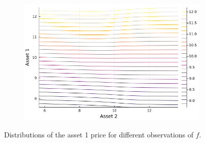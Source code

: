 \documentclass{article}
\begin{document}
\begin{figure}
\begin{subfigure}{0.4\textwidth}
    \end{subfigure}
    \begin{subfigure}{0.4\textwidth}
        \includegraphics[width=\textwidth]{../plots/params/more-corr-meanvarshift/p1.png}
    \end{subfigure}
    \caption{Distributions of the asset 1 price for different observations of $f$.}
    \label{fig:p1}
\end{figure}
\end{document}
